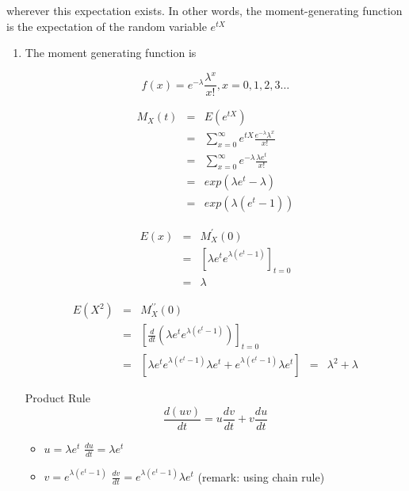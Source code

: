 \documentclass[a4paper,12pt]{article}
\begin{document}
wherever this expectation exists. In other words, the moment-generating function is the expectation of the random variable 
${\displaystyle e^{tX}} $
\begin{enumerate}
\item  The moment generating function is

\[f(x) = e^{-\lambda} \frac{\lambda^x}{x!}, x=0,1,2,3 \ldots\]


\begin{eqnarray*}
M_X(t) &=& E(e^{tX}) \\
&=& \sum^{\infty}_{x=0} e^{tX} \frac{e^{-\lambda}\lambda^{x}}{x!}\\
&=& \sum^{\infty}_{x=0} e^{-\lambda} \frac{\lambda e^t}{x!}\\
&=& exp(\lambda e^t - \lambda) \\
&=& exp(\lambda(e^t-1))
\end{eqnarray*}



\begin{eqnarray*}
E(x) 
&=& M_X^{\prime}(0) \\
&=& \left[ \lambda e^{t} e^{\lambda(e^t-1)} \right]_{t=0}\\
&=& \lambda
\end{eqnarray*}

\begin{eqnarray*}
E(X^2) 
&=& M_X^{\prime\prime}(0) \\
&=& \left[ \frac{d}{dt} \left( \lambda e^{t} e^{\lambda(e^t-1)} \right)\right]_{t=0}\\
&=& \left[ \lambda e^{t} e^{\lambda(e^t-1)}\lambda e^{t} + e^{\lambda(e^t-1)}\lambda e^{t}   \right]
&=& \lambda^2 + \lambda
\end{eqnarray*}

\begin{framed}
Product Rule \[ \frac{d(uv)}{dt} = u \frac{dv}{dt} +  v\frac{du}{dt}\]

\begin{itemize}
\item $u = \lambda e^{t}$  ${ \displaystyle \frac{du}{dt} = \lambda e^{t} }$
\item $v = e^{\lambda(e^t-1)}$  ${ \displaystyle \frac{dv}{dt} = e^{\lambda(e^t-1)}\lambda e^{t}}$ (remark: using chain rule)
\end{itemize} 
\end{framed}


\end{enumerate}
\end{document}
